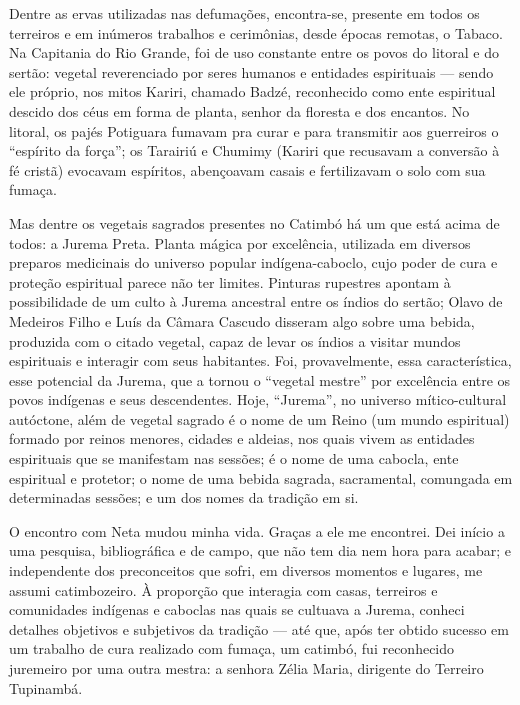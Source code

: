 \begin{refsection}
    Dentre as ervas utilizadas nas defumações, encontra-se, presente em todos os terreiros e em inúmeros trabalhos e cerimônias, desde épocas remotas, o Tabaco. Na Capitania do Rio Grande, foi de uso constante entre os povos do litoral e do sertão: vegetal reverenciado por seres humanos e entidades espirituais --- sendo ele próprio, nos mitos Kariri, chamado Badzé, reconhecido como ente espiritual descido dos céus em forma de planta, senhor da floresta e dos encantos. No litoral, os pajés Potiguara fumavam pra curar e para transmitir aos guerreiros o ``espírito da força''; os Tarairiú e Chumimy (Kariri que recusavam a conversão à fé cristã) evocavam espíritos, abençoavam casais e fertilizavam o solo com sua fumaça. 

    Mas dentre os vegetais sagrados presentes no Catimbó há um que está acima de todos: a Jurema Preta. Planta mágica por excelência, utilizada em diversos preparos medicinais do universo popular indígena-caboclo, cujo poder de cura e proteção espiritual parece não ter limites. Pinturas rupestres apontam à possibilidade de um culto à Jurema ancestral entre os índios do sertão; Olavo de Medeiros Filho e Luís da Câmara Cascudo disseram algo sobre uma bebida, produzida com o citado vegetal, capaz de levar os índios a visitar mundos espirituais e interagir com seus habitantes. Foi, provavelmente, essa característica, esse potencial da Jurema, que a tornou o ``vegetal mestre'' por excelência entre os povos indígenas e seus descendentes. Hoje, ``Jurema'', no universo mítico-cultural autóctone, além de vegetal sagrado é o nome de um Reino (um mundo espiritual) formado por reinos menores, cidades e aldeias, nos quais vivem as entidades espirituais que se manifestam nas sessões; é o nome de uma cabocla, ente espiritual e protetor; o nome de uma bebida sagrada, sacramental, comungada em determinadas sessões; e um dos nomes da tradição em si. 

    O encontro com Neta mudou minha vida. Graças a ele me encontrei. Dei início a uma pesquisa, bibliográfica e de campo, que não tem dia nem hora para acabar; e independente dos preconceitos que sofri, em diversos momentos e lugares, me assumi catimbozeiro. À proporção que interagia com casas, terreiros e comunidades indígenas e caboclas nas quais se cultuava a Jurema, conheci detalhes objetivos e subjetivos da tradição --- até que, após ter obtido sucesso em um trabalho de cura realizado com fumaça, um catimbó, fui reconhecido juremeiro por uma outra mestra: a senhora Zélia Maria, dirigente do Terreiro Tupinambá. 


\end{refsection}
